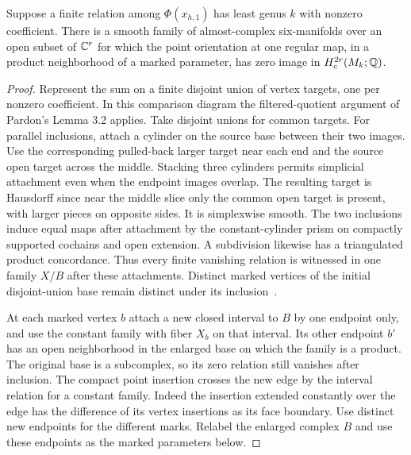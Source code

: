 \begin{lemma}\label{lem:relation}
Suppose a finite relation among $\Phi(x_{h,1})$ has least genus $k$
with nonzero coefficient. There is a smooth family of almost-complex
six-manifolds over an open subset of $\mathbb C^r$ for which the point
orientation at one regular map, in a product neighborhood of a
marked parameter, has zero image in $H_c^{2r}(M_k;\mathbb Q)$.
\end{lemma}
\begin{proof}
Represent the sum on a finite disjoint
union of vertex targets, one per nonzero coefficient. In this
comparison diagram the filtered-quotient argument of Pardon's Lemma
3.2 applies. Take disjoint unions for common targets. For parallel
inclusions, attach a cylinder on the source base between their two
images. Use the corresponding pulled-back larger target near each
end and the source open target across the middle. Stacking three
cylinders permits simplicial attachment even when the endpoint
images overlap. The resulting target is Hausdorff since near the middle slice only the common open target is present, with
larger pieces on opposite sides. It is simplexwise smooth.
The two inclusions induce equal maps after attachment by the
constant-cylinder prism on compactly supported cochains and open
extension. A subdivision likewise has a triangulated product
concordance. Thus every finite vanishing relation is witnessed in
one family $X/B$ after these attachments. Distinct marked vertices
of the initial disjoint-union base remain distinct under its
inclusion~\cite[Lemmas 3.2--3.4]{Pardon}.

At each marked vertex $b$ attach a new closed interval to $B$ by
one endpoint only, and use the constant family with fiber $X_b$
on that interval. Its other endpoint $b'$ has an open neighborhood
in the enlarged base on which the family is a product.
The original base is a subcomplex, so its zero relation still
vanishes after inclusion. The compact point insertion crosses the
new edge by the interval relation for a constant family. Indeed
the insertion extended constantly over the edge has the difference
of its vertex insertions as its face boundary. Use distinct new
endpoints for the different marks. Relabel the enlarged complex
$B$ and use these endpoints as the marked parameters below.


\end{proof}

